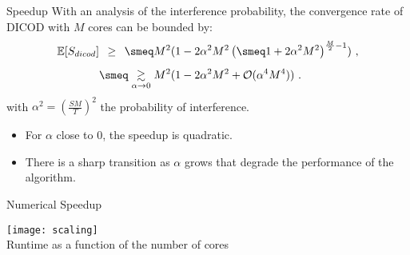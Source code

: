 \documentclass[defense.tex]{subfiles}
\begin{document}
\begin{frame}{Speedup}
With an analysis of the interference probability, the convergence rate of DICOD with $M$ cores can be bounded by:
\begin{equation}
	\label{eq:seedup}
	\begin{split}
		\mathbb E[S_{dicod}] & \underset{\phantom{\alpha \to 0}}{\ge} \smeq M^2 ( 1- 2\alpha^2M^2\left(\smeq1 +2\alpha^2M^2\right)^{\frac{M}{2}-1})~,\\
		&\smeq\underset{\alpha \to 0}{\gtrsim} M^2(1-2\alpha^2M^2 + \mathcal O(\alpha^4M^4))~.
	\end{split}
\end{equation}
with $\alpha^2 = \left(\frac{SM}{T}\right)^2$ the probability of interference.\\[.5em]
\begin{itemize}
	\item For $\alpha$ close to 0, the speedup is quadratic.
	\item There is a sharp transition as $\alpha$ grows that degrade the performance of the algorithm.
\end{itemize}
\end{frame}


\begin{frame}{Numerical Speedup}

\centering
		\texttt{[image: scaling]}\\
Runtime as a function of the number of cores

\end{frame}

\end{document}

